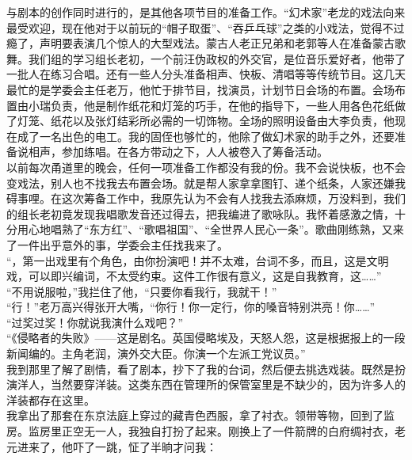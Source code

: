 与剧本的创作同时进行的，是其他各项节目的准备工作。“幻术家”老龙的戏法向来最受欢迎，现在他对于以前玩的“帽子取蛋”、“吞乒乓球”之类的小戏法，觉得不过瘾了，声明要表演几个惊人的大型戏法。蒙古人老正兄弟和老郭等人在准备蒙古歌舞。我们组的学习组长老初，一个前汪伪政权的外交官，是位音乐爱好者，他带了一批人在练习合唱。还有一些人分头准备相声、快板、清唱等等传统节目。这几天最忙的是学委会主任老万，他忙于排节目，找演员，计划节日会场的布置。会场布置由小瑞负责，他是制作纸花和灯笼的巧手，在他的指导下，一些人用各色花纸做了灯笼、纸花以及张灯结彩所必需的一切饰物。全场的照明设备由大李负责，他现在成了一名出色的电工。我的固侄也够忙的，他除了做幻术家的助手之外，还要准备说相声，参加练唱。在各方带动之下，人人被卷入了筹备活动。\\

以前每次甬道里的晚会，任何一项准备工作都没有我的份。我不会说快板，也不会变戏法，别人也不找我去布置会场。就是帮人家拿拿图钉、递个纸条，人家还嫌我碍事哩。在这次筹备工作中，我原先认为不会有人找我去添麻烦，万没料到，我们的组长老初竟发现我唱歌发音还过得去，把我编进了歌咏队。我怀着感激之情，十分用心地唱熟了“东方红”、“歌唱祖国”、“全世界人民心一条”。歌曲刚练熟，又来了一件出乎意外的事，学委会主任找我来了。\\

“，第一出戏里有个角色，由你扮演吧！并不太难，台词不多，而且，这是文明戏，可以即兴编词，不太受约束。这件工作很有意义，这是自我教育，这……”\\

“不用说服啦，”我拦住了他，“只要你看我行，我就干！”\\

“行！”老万高兴得张开大嘴，“你行！你一定行，你的嗓音特别洪亮！你……”\\

“过奖过奖！你就说我演什么戏吧？”\\

“《侵略者的失败》——这是剧名。英国侵略埃及，天怒人怨，这是根据报上的一段新闻编的。主角老润，演外交大臣。你演一个左派工党议员。”\\

我到那里了解了剧情，看了剧本，抄下了我的台词，然后便去挑选戏装。既然是扮演洋人，当然要穿洋装。这类东西在管理所的保管室里是不缺少的，因为许多人的洋装都存在这里。\\

我拿出了那套在东京法庭上穿过的藏青色西服，拿了衬衣。领带等物，回到了监房。监房里正空无一人，我独自打扮了起来。刚换上了一件箭牌的白府绸衬衣，老元进来了，他吓了一跳，怔了半晌才问我：\\


